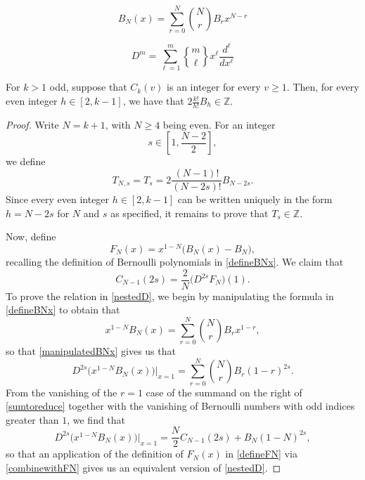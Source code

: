 \documentclass[10pt,a4paper]{amsart}
\DeclareRobustCommand{\stirling}{\genfrac\{\}{0pt}{}}
\begin{document}
\begin{equation}\label{defineBNx} 
 B_{N}(x) = \sum_{r=0}^{N} \binom{N}{r} B_{r} x^{N-r}
\end{equation}

\begin{equation}\label{DStirling} 
 D^{m} = \sum_{\ell = 1}^{m} \stirling{m}{\ell} x^{\ell} \frac{d^{\ell}}{dx^{\ell}} 
\end{equation}

\begin{lemma}\label{triangularlemma}
 For $k > 1$ odd, suppose that $C_k(v)$ is an integer for every $v \geq 1$. Then, for every even integer $h \in [2, k-1]$, 
 we have that 
 $ 2 \frac{k!}{h!} B_{h} \in \mathbb{Z}$. 
\end{lemma}

\begin{proof}
 Write $N = k + 1$, with $N \geq 4$ being even. For an integer 
\begin{equation}\label{srange} 
 s \in \left[ 1, \frac{N-2}{2} \right], 
\end{equation}
 we define
\begin{equation}\label{defineTs}
 T_{N, s} = T_{s} = 2 \frac{(N-1)!}{(N-2s)!} B_{N-2s}. 
\end{equation}
 Since every even integer $h \in [2, k-1]$ can be written uniquely in the form
 $h = N - 2s$ for $N$ and $s$ as specified, 
 it remains to prove that $T_{s} \in \mathbb{Z}$. 

 Now, define 
\begin{equation}\label{defineFN}
 F_{N}(x) = x^{1-N} \big( B_{N}(x) - B_{N} \big), 
\end{equation}
 recalling the definition of Bernoulli polynomials in \eqref{defineBNx}. We claim that 
\begin{equation}\label{nestedD}
 C_{N - 1}(2s) = \frac{2}{N} \big( D^{2s} F_{N} \big)(1). 
\end{equation}
 To prove the relation in \eqref{nestedD}, we begin by manipulating the formula in 
 \eqref{defineBNx} to obtain that 
\begin{equation}\label{manipulatedBNx} 
 x^{1-N} B_{N}(x) = \sum_{r=0}^{N} \binom{N}{r} B_{r} x^{1-r},
\end{equation}
 so that \eqref{manipulatedBNx} gives us that 
\begin{equation}\label{sumtoreduce} 
 D^{2s}\big( x^{1-N} B_{N}(x) \big) \Big|_{x=1}
 = \sum_{r=0}^{N} \binom{N}{r} B_{r}(1-r)^{2s}. 
\end{equation}
 From the vanishing of the $r = 1$ case of the summand on the right of \eqref{sumtoreduce} together with the vanishing of Bernoulli 
 numbers with odd indices greater than $1$, we find that 
\begin{equation}\label{combinewithFN} 
 D^{2s}\big( x^{1-N} B_{N}(x) \big) \Big|_{x=1}
 = \frac{N}{2} C_{N-1}(2s) + B_{N}(1-N)^{2s}, 
\end{equation}
 so that an application of the definition of $F_{N}(x)$ in \eqref{defineFN}
 via \eqref{combinewithFN} gives us an equivalent version of \eqref{nestedD}. 


\end{proof}
\end{document}
